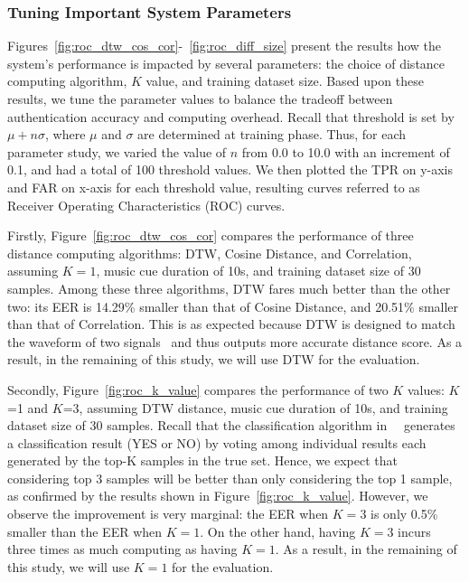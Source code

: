 \subsubsection{Tuning Important System Parameters}
Figures~\ref{fig:roc_dtw_cos_cor}-~\ref{fig:roc_diff_size} present the results how the system's performance is impacted by several parameters: the choice of distance computing algorithm, $K$ value, and training dataset size.
Based upon these results, we tune the parameter values to balance the tradeoff between authentication accuracy and computing overhead. Recall that threshold is set by $\mu+n\sigma$, where $\mu$ and $\sigma$ are determined at training phase. Thus, for each parameter study, we varied the value of $n$ from 0.0 to 10.0 with an increment of 0.1, and had a total of 100 threshold values. We then plotted the TPR  on y-axis and FAR on x-axis for each threshold value,  resulting curves referred to as Receiver Operating Characteristics (ROC) curves. %
 
Firstly, Figure~\ref{fig:roc_dtw_cos_cor} compares the performance of three distance computing algorithms: DTW, Cosine Distance, and Correlation, assuming $K=1$, music cue duration of 10s, and training dataset size of 30 samples.  Among these three algorithms, DTW fares much better than the other two: its EER is 14.29\% smaller than that of Cosine Distance, and 20.51\% smaller than that of Correlation. This is as expected because DTW is designed to match the waveform of two signals~\cite{dtw} and thus outputs more accurate distance score. As a result, in the remaining of this study, we will use DTW for the evaluation.


Secondly, Figure~\ref{fig:roc_k_value} compares the performance of two $K$ values: $K$=1 and $K$=3, assuming DTW distance, music cue duration of 10s, and training dataset size of 30 samples.  Recall that the classification algorithm in ~\systemname~generates a classification result (YES or NO) by voting among individual results each generated by the top-K samples in the true set. Hence, we expect that considering top 3 samples will be better than only considering the top 1 sample, as confirmed by the results shown in Figure~\ref{fig:roc_k_value}. However, we observe the improvement is very marginal: the EER when $K=3$ is only 0.5\% smaller than the EER when $K=1$. On the other hand, having $K=3$ incurs three times as much computing as having $K=1$. As a result, in the remaining of this study, we will use $K=1$ for the evaluation.


